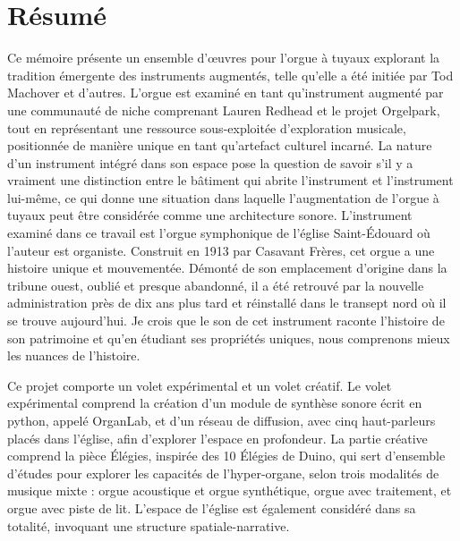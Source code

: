 \documentclass[12pt,twoside,maitrise]{dms_ks}
\theoremstyle{definition}
\begin{document}
\maketitle

\maketitle


\francais

\chapter*{Résumé}

Ce mémoire présente un ensemble d'œuvres pour l'orgue à tuyaux explorant la tradition émergente des instruments augmentés, telle qu'elle a été initiée par Tod Machover et d'autres. 
L'orgue est examiné en tant qu'instrument augmenté par une communauté de niche comprenant Lauren Redhead et le projet Orgelpark, tout en représentant une ressource sous-exploitée d'exploration musicale, positionnée de manière unique en tant qu'artefact culturel incarné. 
La nature d'un instrument intégré dans son espace pose la question de savoir s'il y a vraiment une distinction entre le bâtiment qui abrite l'instrument et l'instrument lui-même, ce qui donne une situation dans laquelle l'augmentation de l'orgue à tuyaux peut être considérée comme une architecture sonore. 
L'instrument examiné dans ce travail est l'orgue symphonique de l'église Saint-Édouard où l'auteur est organiste. 
Construit en 1913 par Casavant Frères, cet orgue a une histoire unique et mouvementée. 
Démonté de son emplacement d'origine dans la tribune ouest, oublié et presque abandonné, il a été retrouvé par la nouvelle administration près de dix ans plus tard et réinstallé dans le transept nord où il se trouve aujourd'hui. 
Je crois que le son de cet instrument raconte l'histoire de son patrimoine et qu'en étudiant ses propriétés uniques, nous comprenons mieux les nuances de l'histoire. 

Ce projet comporte un volet expérimental et un volet créatif. 
Le volet expérimental comprend la création d'un module de synthèse sonore écrit en python, appelé OrganLab, et d'un réseau de diffusion, avec cinq haut-parleurs placés dans l'église, afin d'explorer l'espace en profondeur. 
La partie créative comprend la pièce Élégies, inspirée des 10 Élégies de Duino, qui sert d'ensemble d'études pour explorer les capacités de l'hyper-organe, selon trois modalités de musique mixte : orgue acoustique et orgue synthétique, orgue avec traitement, et orgue avec piste de lit. 
L'espace de l'église est également considéré dans sa totalité, invoquant une structure spatiale-narrative. 
\end{document}
